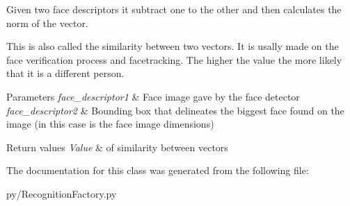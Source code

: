 Given two face descriptors it subtract one to the other and then calculates the norm of the vector. 

This is also called the similarity between two vectors. It is usally made on the face verification process and facetracking. The higher the value the more likely that it is a different person.


\begin{DoxyParams}{Parameters}
{\em face\+\_\+descriptor1} & Face image gave by the face detector \\
\hline
{\em face\+\_\+descriptor2} & Bounding box that delineates the biggest face found on the image (in this case is the face image dimensions)\\
\hline
\end{DoxyParams}

\begin{DoxyRetVals}{Return values}
{\em Value} & of similarity between vectors \\
\hline
\end{DoxyRetVals}


The documentation for this class was generated from the following file\+:\begin{DoxyCompactItemize}
\item 
py/Recognition\+Factory.\+py\end{DoxyCompactItemize}
